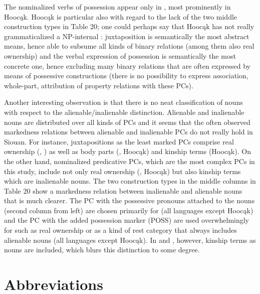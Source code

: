 \documentclass[output=paper]{LSP/langsci}
\begin{document}
The nominalized verbs of possession appear only in , most prominently in Hoocąk. Hoocąk is particular also with regard to the lack of the two middle construction types in Table 20; one could perhaps say that Hoocąk has not really grammaticalized a NP-internal :  juxtaposition is semantically the most abstract means, hence able to subsume all kinds of binary relations (among them also real ownership) and the verbal expression of possession is semantically the most concrete one, hence excluding many binary relations that are often expressed by means of possessive constructions (there is no possibility to express association, whole-part, attribution of property relations with these PCs).

Another interesting observation is that there is no neat classification of nouns with respect to the alienable/inalienable distinction. Alienable and inalienable nouns are distributed over all kinds of PCs and it seems that the often observed markedness relations between alienable and inalienable PCs do not really hold in Siouan. For instance, juxtapositions as the least marked PCs comprise real ownership (, ) as well as body parts (, Hoocąk) and kinship terms (Hoocąk). On the other hand, nominalized predicative PCs, which are the most complex PCs in this study, include not only real ownership (, Hoocąk) but also kinship terms which are inalienable nouns. The two construction types in the middle columns in Table 20 show a markedness relation between inalienable and alienable nouns that is much clearer. The PC with the possessive pronouns attached to the  nouns (second column from left) are chosen primarily for  (all languages except Hoocąk) and the PC with the added possession marker (\textsc{POSS}) are used overwhelmingly for  such as real ownership or as a kind of rest category that always includes alienable nouns (all languages except Hoocąk). In  and , however, kinship terms as  nouns are included, which blurs this distinction to some degree. 
   
\section*{Abbreviations}
\end{document}
